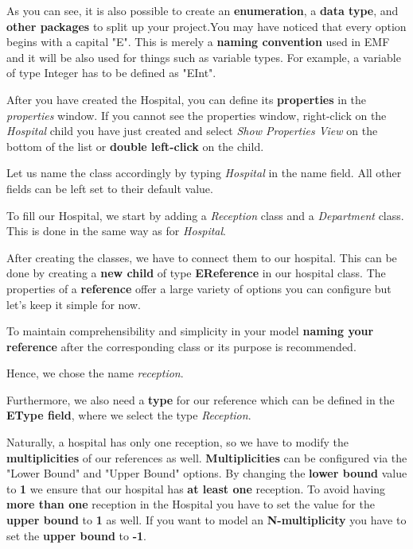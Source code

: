 As you can see, it is also possible to create an \textbf{enumeration}, a \textbf{data type}, and \textbf{other packages} to split up your project.\newline You may have noticed that every option begins with a capital "E". This is merely a \textbf{naming convention} used in EMF and it will be also used for things such as variable types. For example, a variable of type Integer has to be defined as "EInt".\newline

After you have created the Hospital, you can define its \textbf{properties} in the \textsf{\textit{properties}} window. If you cannot see the properties window, right-click on the \textit{\textsf{Hospital}} child you have just created and select \textit{\textsf{Show Properties View}} on the bottom of the list or \textbf{double left-click} on the child.

Let us name the class accordingly by typing \textit{\textsf{Hospital}} in the name field. All other fields can be left set to their default value.\newline

To fill our Hospital, we start by adding a \textsf{\textit{Reception}} class and a \textsf{\textit{Department}} class. This is done in the same way as for \textit{\textsf{Hospital}}.\newline

After creating the classes, we have to connect them to our hospital. This can be done by creating a \textbf{new child} of type \textbf{EReference} in our hospital class.
The properties of a \textbf{reference} offer a large variety of options you can configure but let's keep it simple for now.

To maintain comprehensibility and simplicity in your model \textbf{naming your reference} after the corresponding class or its purpose is recommended.

Hence, we chose the name \textsf{\textit{reception}}.\newline

Furthermore, we also need a \textbf{type} for our reference which can be defined in the \textbf{EType field}, where we select the type \textsf{\textit{Reception}}.\newline

Naturally, a hospital has only one reception, so we have to modify the \textbf{multiplicities} of our references as well. \textbf{Multiplicities} can be configured via the \textsf{"Lower Bound"} and \textsf{"Upper Bound"} options. By changing the \textbf{lower bound} value to \textbf{1} we ensure that our hospital has \textbf{at least one} reception. To avoid having \textbf{more than one} reception in the Hospital you have to set the value for the \textbf{upper bound} to \textbf{1} as well. If you want to model an \textbf{N-multiplicity} you have to set the \textbf{upper bound} to \textbf{-1}.\newline

